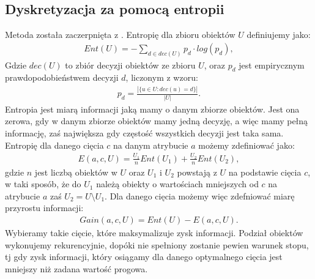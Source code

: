 \documentclass[magisterska]{pracamgr}
\theoremstyle{plain}
\theoremstyle{definition}
\theoremstyle{remark}
\begin{document}
\subsection{Dyskretyzacja za pomocą entropii}
Metoda została zaczerpnięta z \cite{Discretization}.
Entropię dla zbioru obiektów $U$ definiujemy jako:
\begin{align*}
  Ent(U) = - \sum_{d \in dec(U)} p_d \cdot log(p_d),
\end{align*}
Gdzie $dec(U)$ to zbiór decyzji obiektów ze zbioru $U$, oraz $p_d$ jest 
empirycznym prawdopodobieństwem decyzji $d$, liczonym z wzoru:
\begin{align*}
  p_d = \frac{|\{u \in U: dec(u) = d\}|}{|U|}.
\end{align*}
Entropia jest miarą informacji jaką mamy o danym zbiorze obiektów.
Jest ona zerowa, gdy w danym zbiorze obiektów mamy jedną decyzję, a więc 
mamy pełną informację, zaś największa gdy częstość wszystkich decyzji jest taka sama. 
Entropię dla danego cięcia $c$ na danym atrybucie $a$ możemy zdefiniować jako:
\begin{align*}
  E(a, c, U) = \frac{U_1}{n}Ent(U_1) + \frac{U_2}{n}Ent(U_2),
\end{align*}
gdzie $n$ jest liczbą obiektów w $U$ oraz $U_1$ i $U_2$ powstają z $U$ na podstawie cięcia $c$, w taki sposób, że
do $U_1$ należą obiekty o wartościach mniejszych od $c$ na atrybucie $a$ zaś $U_2 = U \setminus U_1$.
Dla danego cięcia możemy więc zdefniować miarę przyrostu informacji:
\begin{align*}
 Gain(a, c, U) = Ent(U) - E(a, c, U).
\end{align*}
Wybieramy takie cięcie, które maksymalizuje zysk informacji. Podział obiektów wykonujemy rekurencyjnie,
dopóki nie spełniony zostanie pewien warunek stopu, tj gdy zysk informacji, który osiągamy
dla danego optymalnego cięcia jest mniejszy niż zadana wartość progowa.
\end{document}
